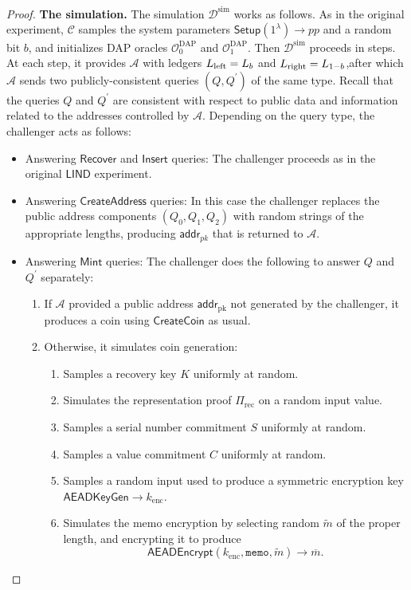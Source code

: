 \documentclass{llncs}
\newcommand{\func}[1]{\mathsf{#1}}
\newcommand{\addr}{\func{addr}}
\begin{document}
\begin{proof}
\textbf{The simulation.} The simulation $\mathcal{D}^{\text{sim}}$ works as follows.
As in the original experiment, $\mathcal{C}$ samples the system parameters $\func{Setup}(1^\lambda) \to pp$ and a random bit $b$, and initializes DAP oracles $\mathcal{O}^{\text{DAP}}_0$ and $\mathcal{O}^{\text{DAP}}_1$.
Then $\mathcal{D}^{\text{sim}}$ proceeds in steps.
At each step, it provides $\mathcal{A}$ with ledgers $L_{\text{\text{left}}} = L_{b}$ and $L_{\text{\text{right}}} = L_{1-b}$,after which $\mathcal{A}$ sends two publicly-consistent queries $(Q, Q^\prime)$ of the same type.
Recall that the queries $Q$ and $Q^\prime$ are consistent with respect to public data and information related to the addresses controlled by $\mathcal{A}$.
Depending on the query type, the challenger acts as follows:
\begin{itemize}
    \item Answering $\func{Recover}$ and $\func{Insert}$ queries: The challenger proceeds as in the original $\func{LIND}$ experiment.
    \item Answering $\func{CreateAddress}$ queries: In this case the challenger replaces the public address components $(Q_0,Q_1,Q_2)$ with random strings of the appropriate lengths, producing $\addr_{pk}$ that is returned to $\mathcal{A}$.
    \item Answering $\func{Mint}$ queries: The challenger does the following to answer $Q$ and $Q^\prime$ separately:
    \begin{enumerate}
        \item If $\mathcal{A}$ provided a public address $\addr_{\text{pk}}$ not generated by the challenger, it produces a coin using $\func{CreateCoin}$ as usual.
        \item Otherwise, it simulates coin generation:
        \begin{enumerate}
            \item Samples a recovery key $K$ uniformly at random.
            \item Simulates the representation proof $\Pi_{\text{rec}}$ on a random input value.
            \item Samples a serial number commitment $S$ uniformly at random.
            \item Samples a value commitment $C$ uniformly at random.
            \item Samples a random input used to produce a symmetric encryption key $\func{AEADKeyGen} \to k_{\text{enc}}$.
            \item Simulates the memo encryption by selecting random $\widetilde{m}$ of the proper length, and encrypting it to produce $$\func{AEADEncrypt}(k_{\text{enc}},\texttt{memo},\widetilde{m}) \to \overline{m}.$$

\end{enumerate}
\end{enumerate}
\end{itemize}
\end{proof}
\end{document}
